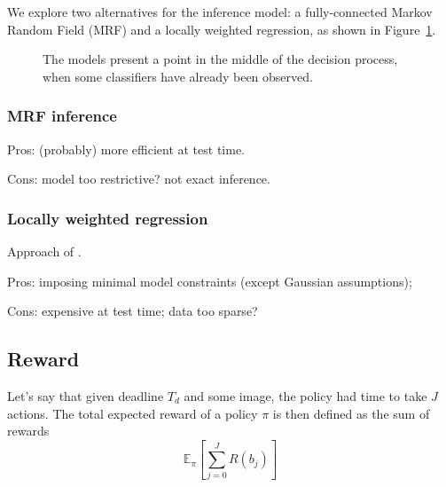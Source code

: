 \documentclass[runningheads]{llncs}
\begin{document}
We explore two alternatives for the inference model: a fully-connected Markov Random Field (MRF) and a locally weighted regression, as shown in Figure~\ref{fig:models}.

\begin{figure}[h!]
\centering
{} \hfill
{}
\caption{The models present a point in the middle of the decision process, when some classifiers have already been observed.}
\label{fig:models}
\end{figure}

\subsubsection{MRF inference}
Pros: (probably) more efficient at test time.

Cons: model too restrictive? not exact inference.

\subsubsection{Locally weighted regression}
Approach of \cite{Gao2011}.

Pros: imposing minimal model constraints (except Gaussian assumptions); 

Cons: expensive at test time; data too sparse?

\subsection{Reward} \label{sec:reward}
Let's say that given deadline $T_d$ and some image, the policy had time to take $J$ actions.
The total expected reward of a policy $\pi$ is then defined as the sum of rewards
\begin{equation}
\mathbb{E}_\pi[\sum_{j=0}^J R(b_j)]
\end{equation}
\end{document}
